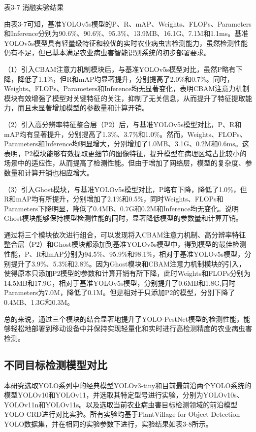 \documentclass[12pt, a4paper, twoside]{ctexart}
\begin{document}
表3-7 消融实验结果

由表3-7可知，基准YOLOv5s模型的P、R、mAP、Weights、FLOPs、Parameters和Inference分别为90.6\%、90.6\%、95.3\%、13.9MB、16.1G、7.1M和1.1ms。基准YOLOv5s模型具有轻量级特征和较优的实时农业病虫害检测能力，虽然检测性能仍有不足，但已基本满足农业病虫害智能识别系统的初步部署要求。

（1）引入CBAM注意力机制模块后，与基准YOLOv5s模型对比，虽然P略有下降，降低了1.1\%，但R和mAP均显著提升，分别提高了2.0\%和0.7\%。同时，Weights、FLOPs、Parameters和Inference均无显著变化，表明CBAM注意力机制模块有效增强了模型对关键特征的关注，抑制了无关信息，从而提升了特征提取能力，而且未显著增加模型的参数量和计算开销。

（2）引入高分辨率特征整合层（P2）后，与基准YOLOv5s模型对比，P、R和mAP均有显著提升，分别提高了1.3\%、3.7\%和1.0\%。然而，Weights、FLOPs、Parameters和Inference均明显增大，分别增加了1.0MB、3.1G、0.2M和0.6ms。这表明，P2模块能够有效提取更细节的图像特征，提升模型在病理区域占比较小的场景中的适应性，从而提高了检测性能。但由于增加了网络层，模型的复杂度、参数量和计算开销也相应增大。

（3）引入Ghost模块，与基准YOLOv5s模型对比，P略有下降，降低了1.0\%，但R和mAP均有所提升，分别增加了2.1\%和0.5\%，同时Weights、FLOPs和Parameters下降明显，降低了0.4MB、0.7G和0.2M和Inference均无变化。说明Ghost模块能够保持模型检测性能的同时，显著降低模型的参数量和计算开销。

通过将三个模块依次进行组合，可以发现将入CBAM注意力机制、高分辨率特征整合层（P2）和Ghost模块都添加到基准YOLOv5s模型中，得到模型的最佳检测性能，P、R和mAP分别为94.5\%、95.9\%和98.1\%，相对于基准YOLOv5s模型，分别提升了3.9\%、5.3\%和2.8\%。因为Ghost模块和CBAM注意力机制模块的引入，使得原本只添加P2模型的参数和计算开销有所下降，此时Weights和FLOPs分别为14.5MB和17.9G，相对于基准YOLOv5s模型，分别提升了0.6MB和1.8G,同时Parameters为7.0M，降低了0.1M。但是相对于只添加P2的模型，分别下降了0.4MB、1.3G和0.3M。

总的来说，通过三个模块的结合显著地提升了YOLO-PestNet模型的检测性能，能够轻松地部署到移动设备中并保持实现轻量化和实时进行高检测精度的农业病虫害检测。


\subsection{不同目标检测模型对比}

本研究选取YOLO系列中的经典模型YOLOv3-tiny和目前最前沿两个YOLO系统的模型YOLOv10和YOLOv11，并选取其特定型号进行实验，分别为YOLOv10s、YOLOv11n和YOLOv11s。以及选取当前农业病虫害目标检测领域的前沿模型YOLO-CRD进行对比实验。所有实验均基于PlantVillage for Object Detection YOLO数据集，并在相同的实验参数下进行，实验结果如表3-8所示。
\end{document}
